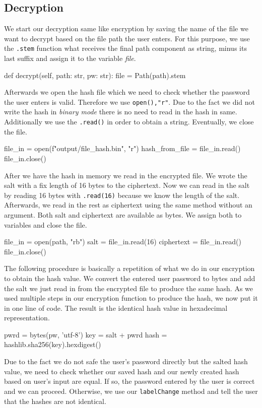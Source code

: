 \documentclass[]{article}
\begin{document}
\subsection{Decryption}
We start our decryption same like encryption by saving the name of the file we want to decrypt based on the file path 
the user enters. For this purpose, we use the \texttt{.stem} function what receives the final path component as string, 
minus its last suffix and assign it to the variable \textit{file}. 

\begin{python}
def decrypt(self, path: str, pw: str):    
    file = Path(path).stem
\end{python}
\noindent
Afterwards we open the hash file which we need to check whether the password the user enters is valid. Therefore we 
use \texttt{open(),"r"}. Due to the fact we did not write the hash in \textit{binary mode} there is no need to
read in the hash in same. Additionally we use the \texttt{.read()} in order to obtain a string. Eventually, we close the 
file. 

\begin{python}
file_in = open(f"output/{file}_hash.bin", "r")
hash_from_file = file_in.read()
file_in.close()
\end{python}
\noindent
After we have the hash in memory we read in the encrypted file. We wrote the salt with a fix length of 16
bytes to the ciphertext. Now we can read in the salt by reading 16 bytes with \texttt{.read(16)} because we know the length
of the salt. Afterwards, we read in the rest as ciphertext using the same method without an argument. 
Both salt and ciphertext are available as bytes. We assign both to variables and close the file.

\begin{python}
file_in = open(path, "rb")
salt = file_in.read(16)
ciphertext = file_in.read() 
file_in.close()
\end{python}
\noindent
The following procedure is basically a repetition of what we do in our encryption to obtain the hash value. We convert the entered
user password to bytes and add the salt we just read in from the encrypted file to produce the same hash.
As we used multiple steps in our encryption function to produce the hash, we now put it in one line of code. The result is 
the identical hash value in hexadecimal representation.

\begin{python}
pwrd = bytes(pw, 'utf-8')
key = salt + pwrd
hash = hashlib.sha256(key).hexdigest()
\end{python}
\noindent
Due to the fact we do not safe the user's password directly but the salted hash value, we need to check whether
our saved hash and our newly created hash based on user's input are equal. If so, the password entered by the user is correct and we 
can proceed. Otherwise, we use our \texttt{labelChange} method and tell the user that the hashes are not identical.
\end{document}
